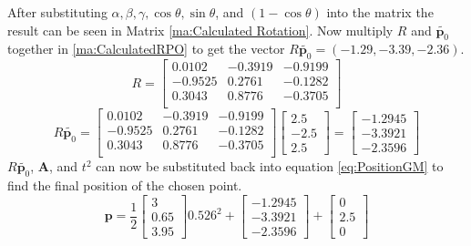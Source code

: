 After substituting $\alpha, \beta, \gamma,\cos\theta, \sin\theta$, and $(1-\cos\theta)$ into the matrix the result can be seen in Matrix \ref{ma:Calculated Rotation}. Now multiply $R$ and $\tilde{\mathbf{p}_{0}}$ together in \ref{ma:CalculatedRPO} to get the vector $	R\tilde{\mathbf{p}_{0}} = (-1.29, -3.39, -2.36)$.
\begin{equation}\label{ma:Calculated Rotation}
	R = 
		\begin{bmatrix}
		   0.0102 & 
		  -0.3919 & 
		  -0.9199 \\
		  
		  -0.9525 & 
		   0.2761 & 
		  -0.1282 \\
		  
		   0.3043 & 
		   0.8776 & 
		  -0.3705 \\
	\end{bmatrix}
\end{equation}
\begin{equation}\label{ma:CalculatedRPO}
	R\tilde{\mathbf{p}_{0}} =
	\begin{bmatrix}
		  0.0102 & 
		  -0.3919 & 
		  -0.9199 \\
		  
		  -0.9525 & 
		  0.2761 & 
		  -0.1282 \\
		  
		  0.3043 & 
		  0.8776 & 
		  -0.3705 \\
	\end{bmatrix}
	\begin{bmatrix}
		 2.5 \\
		-2.5 	 \\
		 2.5 
	\end{bmatrix}
	= 
	\begin{bmatrix}
		 -1.2945 \\
		 -3.3921 \\
		 -2.3596 
	\end{bmatrix}
\end{equation}
$R\tilde{\mathbf{p}_{0}}$, $\mathbf{A}$, and $t^{2}$ can now be substituted back into equation \ref{eq:PositionGM} to find the final position of the chosen point.
\begin{equation}\label{eq:workout}
	\mathbf{p}=\frac{1}{2}
	\begin{bmatrix}
		 3  \\
		 0.65 \\
		 3.95 
	\end{bmatrix}
	0.526^{2}+
	\begin{bmatrix}
		 -1.2945 \\
		 -3.3921 \\
		 -2.3596 
	\end{bmatrix}
	+
	\begin{bmatrix}
	0 \\
	2.5 \\
	0
	\end{bmatrix}
\end{equation}
